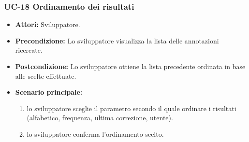 	\subsubsection{UC-18 Ordinamento dei risultati}
		\begin{itemize}
			\item \textbf{Attori:} Sviluppatore.
			\item \textbf{Precondizione:} Lo sviluppatore visualizza la lista delle annotazioni ricercate.
			\item \textbf{Postcondizione:} Lo sviluppatore ottiene la lista precedente ordinata in base alle scelte effettuate.
			\item \textbf{Scenario principale:}
				\begin{enumerate}
					\item lo sviluppatore sceglie il parametro secondo il quale ordinare i risultati (alfabetico, frequenza, ultima correzione, utente).
					\item lo sviluppatore conferma l'ordinamento scelto.
				\end{enumerate}
		\end{itemize} 
	
